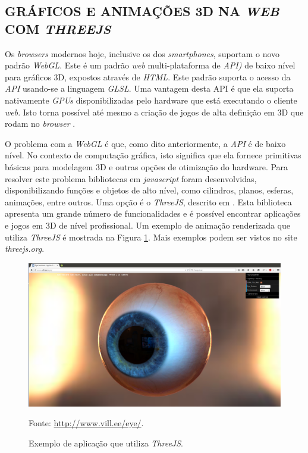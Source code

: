 \subsection{GRÁFICOS E ANIMAÇÕES 3D NA \emph{WEB} COM \emph{THREEJS}} 
Os \emph{browsers} modernos hoje, inclusive os dos \emph{smartphones}, suportam o novo padrão \emph{WebGL}. 
Este é um padrão \emph{web} multi-plataforma de \emph{API)} de baixo nível para gráficos 3D, expostos através de \emph{HTML}. 
Este padrão suporta o acesso da \emph{API} usando-se a linguagem \emph{GLSL}. 
Uma vantagem desta API é que ela suporta nativamente \emph{GPUs} disponibilizadas pelo hardware que está executando o cliente \emph{web}. 
Isto torna possível até mesmo a criação de jogos de alta definição em 3D que rodam no \emph{browser} \cite{Matsuda2013}.

O problema com a \emph{WebGL} é que, como dito anteriormente, a \emph{API} é de baixo nível. 
No contexto de computação gráfica, isto significa que ela fornece primitivas básicas para modelagem 3D e outras opções de otimização do hardware.
Para resolver este problema bibliotecas em \emph{javascript} foram desenvolvidas, disponibilizando funções e objetos de alto nível, como cilindros, planos, esferas, animações, entre outros. 
Uma opção é o \emph{ThreeJS}, descrito em . 
Esta biblioteca apresenta um grande número de funcionalidades e é possível encontrar aplicações e jogos em 3D de nível profissional. 
Um exemplo de animação renderizada que utiliza \emph{ThreeJS} é mostrada na Figura \ref{evil_eye}.
Mais exemplos podem ser vistos no site \emph{threejs.org}.



\begin{figure}[ht]
	\centering
	\includegraphics[width=14cm]{figuras/evil_eye.eps}
	\caption{Exemplo de aplicação que utiliza \emph{ThreeJS}.}
	\label{evil_eye}
	\footnotesize Fonte: \url{http://www.vill.ee/eye/}.
\end{figure}


